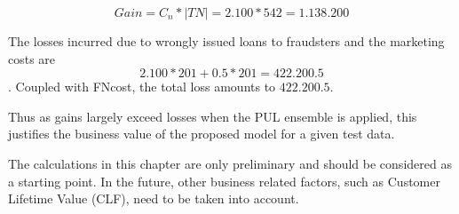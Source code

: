 \[Gain = C_n * |TN| = 2.100 * 542 = 1.138.200\]

The losses incurred due to wrongly issued loans to fraudsters and the marketing costs are \[2.100 * 201 + 0.5 * 201 = 422.200.5\]. Coupled with FNcost, the total loss amounts to $422.200.5$.

Thus as gains largely exceed losses when the PUL ensemble is applied, this justifies the business value of the proposed model for a given test data.

The calculations in this chapter are only preliminary and should be considered as a starting point. In the future, other business related factors, such as Customer Lifetime Value (CLF), need to be taken into account.






